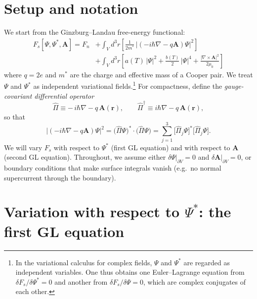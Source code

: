\section*{Setup and notation}
We start from the Ginzburg--Landau free-energy functional:
\begin{equation}
\boxed{
\begin{aligned}
F_s[\Psi,\Psi^*,\mathbf A] = F_n &+ \int_V d^3 r \left[
\frac{1}{2m^*}\, \big|(-i\hbar\nabla - q \mathbf A)\Psi\big|^2 \right] \\
&+ \int_V d^3 r \left[ a(T)\,|\Psi|^2 + \frac{b(T)}{2}\,|\Psi|^4
+ \frac{|\nabla \times \mathbf A|^2}{2\mu_0} \right]
\end{aligned}
\label{app:Fs}
}
\end{equation}
where $q=2e$ and $m^*$ are the charge and effective mass of a Cooper pair.
We treat $\Psi$ and $\Psi^*$ as independent variational fields.\footnote{%
In the variational calculus for complex fields, $\Psi$ and $\Psi^*$ are regarded
as independent variables. One thus obtains one Euler--Lagrange equation from
$\delta F_s / \delta \Psi^* = 0$ and another from $\delta F_s / \delta \Psi = 0$,
which are complex conjugates of each other.}
For compactness, define the \emph{gauge-covariant differential operator}
\[
\hat\Pi \equiv -\,i\hbar\nabla - q\,\mathbf A(\mathbf r),
\qquad
\hat\Pi^\dagger \equiv i\hbar\nabla - q\,\mathbf A(\mathbf r),
\]
so that
\[
\big|(-i\hbar\nabla - q\mathbf A)\Psi\big|^2
= \big(\hat\Pi\Psi\big)^* \cdot \big(\hat\Pi\Psi\big)
= \sum_{j=1}^3 \big[\hat\Pi_j\Psi\big]^* \big[\hat\Pi_j\Psi\big].
\]
We will vary $F_s$ with respect to $\Psi^*$ (first GL equation)
and with respect to $\mathbf A$ (second GL equation). 
Throughout, we assume either $\delta\Psi|_{\partial V}=0$ and $\delta\mathbf A|_{\partial V}=0$,
or boundary conditions that make surface integrals vanish (e.g.\ no normal supercurrent through the boundary).

\section*{Variation with respect to $\Psi^*$: the first GL equation}
\label{app:1_GL-derivation}

